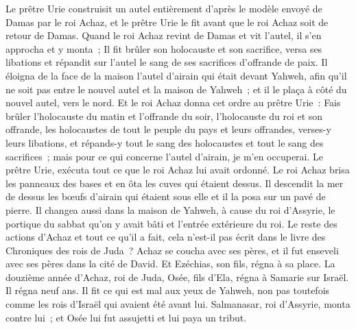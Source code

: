\begin{multicols}{2}
Le prêtre Urie construisit un autel entièrement d'après le modèle envoyé de Damas par le roi Achaz, et le prêtre Urie le fit avant que le roi Achaz soit de retour de Damas.
Quand le roi Achaz revint de Damas et vit l'autel, il s'en approcha et y monta~;
Il fit brûler son holocauste et son sacrifice, versa ses libations et répandit sur l'autel le sang de ses sacrifices d'offrande de paix.
Il éloigna de la face de la maison l'autel d'airain qui était devant Yahweh, afin qu'il ne soit pas entre le nouvel autel et la maison de Yahweh~; et il le plaça à côté du nouvel autel, vers le nord.
Et le roi Achaz donna cet ordre au prêtre Urie~: Fais brûler l'holocauste du matin et l'offrande du soir, l'holocauste du roi et son offrande, les holocaustes de tout le peuple du pays et leurs offrandes, verses-y leurs libations, et répands-y tout le sang des holocaustes et tout le sang des sacrifices~; mais pour ce qui concerne l'autel d'airain, je m'en occuperai.
Le prêtre Urie, exécuta tout ce que le roi Achaz lui avait ordonné.
Le roi Achaz brisa les panneaux des bases et en ôta les cuves qui étaient dessus. Il descendit la mer de dessus les bœufs d'airain qui étaient sous elle et il la posa sur un pavé de pierre.
Il changea aussi dans la maison de Yahweh, à cause du roi d'Assyrie, le portique du sabbat qu'on y avait bâti et l'entrée extérieure du roi.
Le reste des actions d'Achaz et tout ce qu'il a fait, cela n'est-il pas écrit dans le livre des Chroniques des rois de Juda~?
Achaz se coucha avec ses pères, et il fut enseveli avec ses pères dans la cité de David. Et Ezéchias, son fils, régna à sa place.
\VerseOne{}La douzième année d'Achaz, roi de Juda, Osée, fils d'Ela, régna à Samarie sur Israël. Il régna neuf ans.
Il fit ce qui est mal aux yeux de Yahweh, non pas toutefois comme les rois d'Israël qui avaient été avant lui.
Salmanasar, roi d'Assyrie, monta contre lui~; et Osée lui fut assujetti et lui paya un tribut.

\end{multicols}
